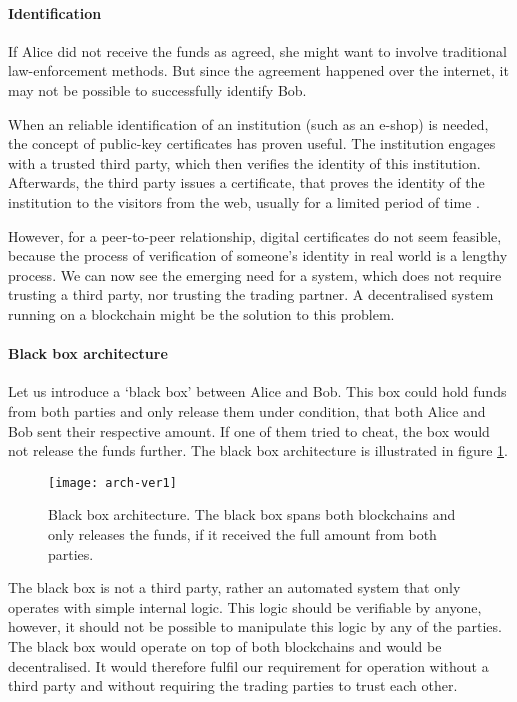 \paragraph{Identification} 
If Alice did not receive the funds as agreed, she might want to involve traditional law-enforcement methods. But since the agreement happened over the internet, it may not be possible to successfully identify Bob.

When an reliable identification of an institution (such as an e-shop) is needed, the concept of public-key certificates has proven useful. The institution engages with a trusted third party, which then verifies the identity of this institution. Afterwards, the third party issues a certificate, that proves the identity of the institution to the visitors from the web, usually for a limited period of time \cite{Lee2013SecurityArchitects}. 

However, for a peer-to-peer relationship, digital certificates do not seem feasible, because the process of verification of someone's identity in real world is a lengthy process. We can now see the emerging need for a system, which does not require trusting a third party, nor trusting the trading partner. A decentralised system running on a blockchain might be the solution to this problem.

\paragraph{Black box architecture}
Let us introduce a `black box' between Alice and Bob. This box could hold funds from both parties and only release them under condition, that both Alice and Bob sent their respective amount. If one of them tried to cheat, the box would not release the funds further. The black box architecture is illustrated in figure \ref{fig:arch-ver1}.
% 
\begin{figure}[ht]
    \centering
    \texttt{[image: arch-ver1]}
    \caption{Black box architecture. The black box spans both blockchains and only releases the funds, if it received the full amount from both parties.}
    \label{fig:arch-ver1}
\end{figure}

The black box is not a third party, rather an automated system that only operates with simple internal logic. This logic should be verifiable by anyone, however, it should not be possible to manipulate this logic by any of the parties. The black box would operate on top of both blockchains and would be decentralised. It would therefore fulfil our requirement for operation without a third party and without requiring the trading parties to trust each other.

